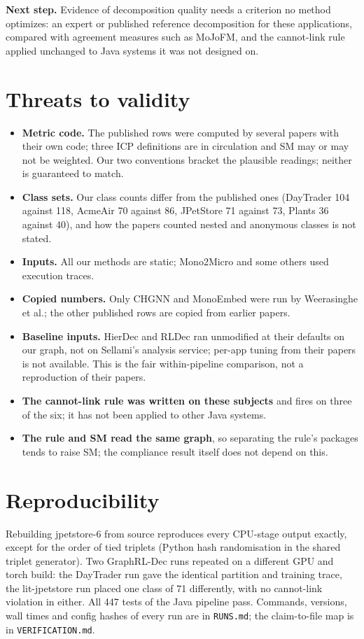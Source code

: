 \documentclass[10pt,a4paper]{article}
\begin{document}
\textbf{Next step.} Evidence of decomposition quality needs a criterion no method optimizes: an expert or published reference decomposition for these applications, compared with agreement measures such as MoJoFM, and the cannot-link rule applied unchanged to Java systems it was not designed on.
\section{Threats to validity}\label{sec:threats}
\begin{itemize}\setlength{\itemsep}{2pt}
\item \textbf{Metric code.} The published rows were computed by several papers with their own code; three ICP definitions are in circulation and SM may or may not be weighted. Our two conventions bracket the plausible readings; neither is guaranteed to match.
\item \textbf{Class sets.} Our class counts differ from the published ones (DayTrader 104 against 118, AcmeAir 70 against 86, JPetStore 71 against 73, Plants 36 against 40), and how the papers counted nested and anonymous classes is not stated.
\item \textbf{Inputs.} All our methods are static; Mono2Micro and some others used execution traces.
\item \textbf{Copied numbers.} Only CHGNN and MonoEmbed were run by Weerasinghe et al.; the other published rows are copied from earlier papers.
\item \textbf{Baseline inputs.} HierDec and RLDec ran unmodified at their defaults on our graph, not on Sellami's analysis service; per-app tuning from their papers is not available. This is the fair within-pipeline comparison, not a reproduction of their papers.
\item \textbf{The cannot-link rule was written on these subjects} and fires on three of the six; it has not been applied to other Java systems.
\item \textbf{The rule and SM read the same graph}, so separating the rule's packages tends to raise SM; the compliance result itself does not depend on this.
\end{itemize}
\section{Reproducibility}
Rebuilding jpetstore-6 from source reproduces every CPU-stage output exactly, except for the order of tied triplets (Python hash randomisation in the shared triplet generator). Two GraphRL-Dec runs repeated on a different GPU and torch build: the DayTrader run gave the identical partition and training trace, the lit-jpetstore run placed one class of 71 differently, with no cannot-link violation in either. All 447 tests of the Java pipeline pass. Commands, versions, wall times and config hashes of every run are in \texttt{RUNS.md}; the claim-to-file map is in \texttt{VERIFICATION.md}.
\end{document}
